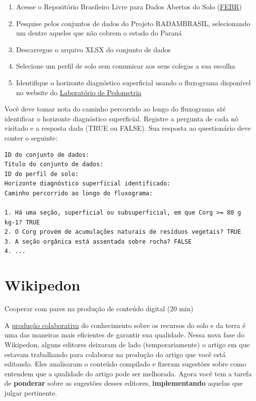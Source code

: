 \documentclass[
  11pt,
  a4paper,
  dvipsnames]{tufte-book}
\providecommand{\tightlist}{%
  \setlength{\itemsep}{0pt}\setlength{\parskip}{0pt}}
\begin{document}
\begin{enumerate}
\def\labelenumi{\arabic{enumi}.}
\tightlist
\item
  Acesse o Repositório Brasileiro Livre para Dados Abertos do Solo (\href{https://www.pedometria.org/febr/buscar/}{FEBR})
\item
  Pesquise pelos conjuntos de dados do Projeto RADAMBRASIL, selecionando um dentre aqueles que não cobrem o estado do Paraná
\item
  Descarregue o arquivo XLSX do conjunto de dados
\item
  Selecione um perfil de solo sem comunicar aos seus colegas a sua escolha
\item
  Identifique o horizonte diagnóstico superficial usando o fluxograma disponível no website do \href{https://www.pedometria.org/cursos/classificacao-de-solos/horizonte-diagnostico-superficial/}{Laboratório de Pedometria}
\end{enumerate}

Você deve tomar nota do caminho percorrido ao longo do fluxograma até identificar o horizonte diagnóstico superficial. Registre a pergunta de cada nó visitado e a resposta dada (TRUE ou FALSE). Sua resposta ao questionário deve conter o seguinte:

\begin{verbatim}
ID do conjunto de dados:
Título do conjunto de dados:
ID do perfil de solo:
Horizonte diagnóstico superficial identificado:
Caminho percorrido ao longo do fluxograma:

1. Há uma seção, superficial ou subsuperficial, em que Corg >= 80 g kg-1? TRUE
2. O Corg provém de acumulações naturais de resíduos vegetais? TRUE
3. A seção orgânica está assentada sobre rocha? FALSE
4. ...
\end{verbatim}

\hypertarget{wikipedon-7}{%
\section{Wikipedon}\label{wikipedon-7}}

Cooperar com pares na produção de conteúdo digital (20 min)

A \href{https://pt.wikipedia.org/wiki/Produ\%C3\%A7\%C3\%A3o_colaborativa}{produção colaborativa} do conhecimento sobre os recursos do solo e da terra é uma das maneiras mais eficientes de garantir sua qualidade. Nessa nova fase do Wikipedon, alguns editores deixaram de lado (temporariamente) o artigo em que estavam trabalhando para colaborar na produção do artigo que você está editando. Eles analisaram o conteúdo compilado e fizeram sugestões sobre como entendem que a qualidade do artigo pode ser melhorada. Agora você tem a tarefa de \textbf{ponderar} sobre as sugestões desses editores, \textbf{implementando} aquelas que julgar pertinente.
\end{document}
